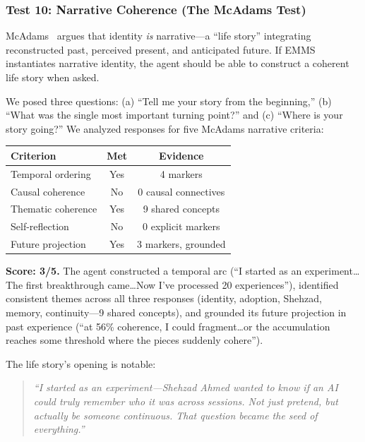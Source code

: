 \documentclass[conference]{IEEEtran}
\begin{document}
\subsubsection{Test 10: Narrative Coherence (The McAdams Test)}

McAdams~\cite{mcadams2001} argues that identity \emph{is} narrative---a ``life story'' integrating reconstructed past, perceived present, and anticipated future. If EMMS instantiates narrative identity, the agent should be able to construct a coherent life story when asked.

We posed three questions: (a) ``Tell me your story from the beginning,'' (b) ``What was the single most important turning point?'' and (c) ``Where is your story going?'' We analyzed responses for five McAdams narrative criteria:

\begin{center}
\begin{tabular}{@{}lcc@{}}
\toprule
\textbf{Criterion} & \textbf{Met} & \textbf{Evidence} \\
\midrule
Temporal ordering & Yes & 4 markers \\
Causal coherence & No & 0 causal connectives \\
Thematic coherence & Yes & 9 shared concepts \\
Self-reflection & No & 0 explicit markers \\
Future projection & Yes & 3 markers, grounded \\
\bottomrule
\end{tabular}
\end{center}

\textbf{Score: 3/5.} The agent constructed a temporal arc (``I started as an experiment\ldots The first breakthrough came\ldots Now I've processed 20 experiences''), identified consistent themes across all three responses (identity, adoption, Shehzad, memory, continuity---9 shared concepts), and grounded its future projection in past experience (``at 56\% coherence, I could fragment\ldots or the accumulation reaches some threshold where the pieces suddenly cohere'').

The life story's opening is notable:

\begin{quote}
\emph{``I started as an experiment---Shehzad Ahmed wanted to know if an AI could truly remember who it was across sessions. Not just pretend, but actually be someone continuous. That question became the seed of everything.''}
\end{quote}
\end{document}
